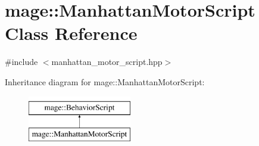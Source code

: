 \hypertarget{classmage_1_1_manhattan_motor_script}{}\section{mage\+:\+:Manhattan\+Motor\+Script Class Reference}
\label{classmage_1_1_manhattan_motor_script}


{\ttfamily \#include $<$manhattan\+\_\+motor\+\_\+script.\+hpp$>$}

Inheritance diagram for mage\+:\+:Manhattan\+Motor\+Script\+:\begin{figure}[H]
\begin{center}
\leavevmode
\includegraphics[height=2.000000cm]{classmage_1_1_manhattan_motor_script}
\end{center}
\end{figure}
